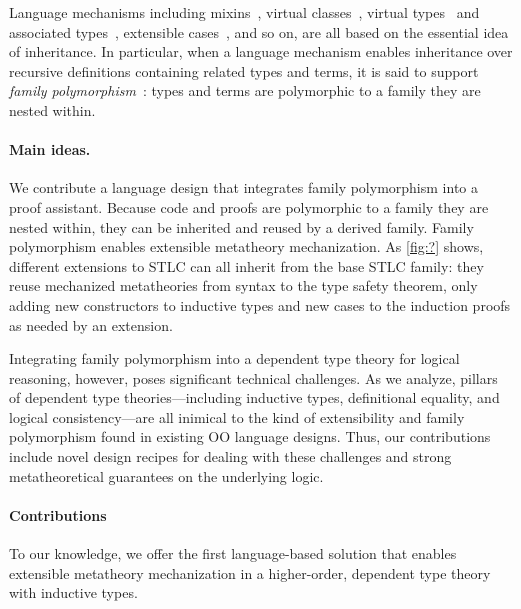 Language mechanisms including
mixins~\cite{mixin-1990},
virtual classes~\cite{virtualclasses-1989,vc-calculus-2006},
virtual types~\cite{thorup97} and associated types~\cite{ckj05},
extensible cases~\cite{bac2006},
and so on, are all based on the essential idea of inheritance.
%
In particular, when a language mechanism enables inheritance over
recursive definitions containing related types and terms,
it is said to support \emph{family polymorphism}~\cite{ernst2001family}:
types and terms are polymorphic to a family they are nested within.

\paragraph{Main ideas.}

We contribute a language design that integrates family polymorphism into
a proof assistant.
Because code and proofs are polymorphic to a family they are nested
within, they can be inherited and reused by a derived family.
%
Family polymorphism enables extensible metatheory mechanization.
As \cref{fig:?} shows,
different extensions to STLC can all inherit from the base STLC family:
they reuse mechanized metatheories from syntax to the type safety
theorem, only adding new constructors to inductive types
and new cases to the induction proofs as needed by an extension.

Integrating family polymorphism into a dependent type theory for
logical reasoning, however, poses significant technical challenges.
As we analyze, pillars of dependent type theories—including
inductive types, definitional equality, and logical consistency—are
all inimical to the kind of extensibility and family polymorphism
found in existing OO language designs.
Thus, our contributions include novel design recipes for dealing with
these challenges and strong meta\-theoretical guarantees on the
underlying logic.

\paragraph{Contributions} To our knowledge, we offer the first
language-based solution that enables extensible metatheory mechanization
in a higher-order, dependent type theory with inductive types.

